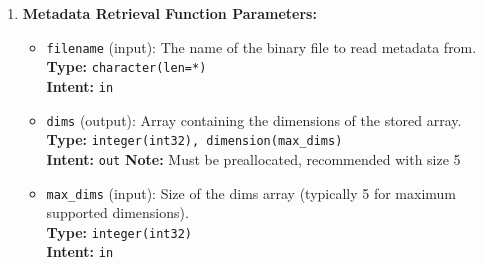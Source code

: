 \begin{enumerate}
\begin{enumerate}
\begin{itemize}
                    \item \texttt{filename} (input): The name of the binary file to create.
                          \\ \textbf{Type:} \texttt{character(len=*)} \\ \textbf{Intent:} \texttt{in}
                          
                    \item \texttt{ierr} (output): Error code indicating operation status.
                          \\ \textbf{Type:} \texttt{integer(int32)} \\ \textbf{Intent:} \texttt{out}
                          \\ \textbf{Values:} 0 indicates success, non-zero values indicate
                          specific error conditions
                  \end{itemize}
                  \begin{lstlisting}[language=Fortran, caption={Example usage of a serialize function}]
call serialize_int_2d(array, "test_file.bin", ierr)
                  \end{lstlisting}
                  
            \item \textbf{Metadata Retrieval Function Parameters:}
                  \begin{itemize}
                    \item \texttt{filename} (input): The name of the binary file to read
                          metadata from. \\ \textbf{Type:} \texttt{character(len=*)} \\
                          \textbf{Intent:} \texttt{in}
                          
                    \item \texttt{dims} (output): Array containing the dimensions of the
                          stored array. \\ \textbf{Type:} \texttt{integer(int32), dimension(max\_dims)}
                          \\ \textbf{Intent:} \texttt{out} \textbf{Note:} Must be preallocated,
                          recommended with size 5
                          
                    \item \texttt{max\_dims} (input): Size of the dims array (typically
                          5 for maximum supported dimensions). \\ \textbf{Type:} \texttt{integer(int32)}
                          \\ \textbf{Intent:} \texttt{in}
                          

\end{itemize}
\end{enumerate}
\end{enumerate}

